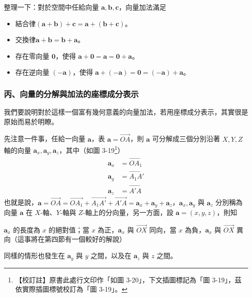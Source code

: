 整理一下：對於空間中任給向量 $\mathbf{a}, \mathbf{b}, \mathbf{c}$，向量加法滿足
\begin{itemize}[leftmargin=3em]
  \item[(I)] 結合律\quad $(\mathbf{a} + \mathbf{b}) + \mathbf{c} = \mathbf{a} + (\mathbf{b} + \mathbf{c})$。
  \item[(II)] 交換律\quad $\mathbf{a} + \mathbf{b} = \mathbf{b} + \mathbf{a}$。
  \item[(III)] 存在零向量 $\mathbf{0}$，使得 $\mathbf{a} + \mathbf{0} = \mathbf{a} = \mathbf{0} + \mathbf{a}$。
  \item[(IV)] 存在逆向量 $(-\mathbf{a})$，使得 $\mathbf{a} + (-\mathbf{a}) = \mathbf{0} = (-\mathbf{a}) + \mathbf{a}$。
\end{itemize}

\subsubsection*{丙、向量的分解與加法的座標成分表示}

我們要說明對於這樣一個富有幾何意義的向量加法，若用座標成分表示，其實很是原始而易於明瞭。

\label{note:b3-ch3-p87-fig-ref}%
先注意一件事，任給一向量 $\mathbf{a}$，表 $\mathbf{a} = \vec{OA}$，則 $\mathbf{a}$ 可分解成三個分別沿著 $X, Y, Z$ 軸的向量 $\mathbf{a}_x, \mathbf{a}_y, \mathbf{a}_z$，其中（如圖 3-19\footnote{【校訂註】原書此處行文印作「如圖 3-20」，下文插圖標記為「圖 3-19」，茲依實際插圖標號校訂為「圖 3-19」。}）
\begin{align*}
\mathbf{a}_x &= \vec{OA_1} \\
\mathbf{a}_y &= \vec{A_1 A'} \\
\mathbf{a}_z &= \vec{A'A}
\end{align*}
也就是說，$\mathbf{a} = \vec{OA} = \vec{OA_1} + \vec{A_1 A'} + \vec{A'A} = \mathbf{a}_x + \mathbf{a}_y + \mathbf{a}_z$，$\mathbf{a}_x, \mathbf{a}_y$ 與 $\mathbf{a}_z$ 分別稱為向量 $\mathbf{a}$ 在 $X$-軸、$Y$-軸與 $Z$-軸上的分向量，另一方面，設 $\mathbf{a} = (x, y, z)$，則知
\begin{center}
$\mathbf{a}_x$ 的長度為 $x$ 的絕對值；當 $x$ 為正，$\mathbf{a}_x$ 與 $\vec{OX}$ 同向，當 $x$ 為負，$\mathbf{a}_x$ 與 $\vec{OX}$ 異向（這事將在第四節有一個較好的解說）
\end{center}
同樣的情形也發生在 $\mathbf{a}_y$ 與 $y$ 之間，以及在 $\mathbf{a}_z$ 與 $z$ 之間。

